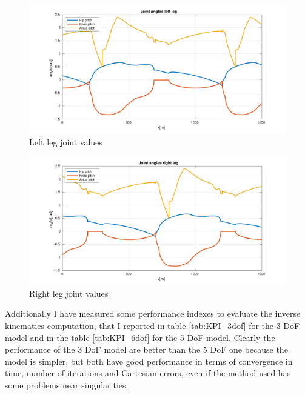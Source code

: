 \documentclass[a4paper]{article}
\begin{document}
\begin{figure}
     
        \center
        \includegraphics[scale=0.5]{plot/kinematic/left_leg_joints.pdf} 
        \caption{Left leg joint values} 
        \label{fig:left_leg_joints}
  
\end{figure}

\begin{figure}
\center
\includegraphics[scale=0.5]{plot/kinematic/right_leg_joints.pdf} 
\caption{Right leg joint values} 
\label{fig:right_leg_joints}
\end{figure}

Additionally I have measured some performance indexes to evaluate the inverse kinematics computation, that I reported in table \ref{tab:KPI_3dof} for the 3 DoF model and in the table \ref{tab:KPI_6dof}  for the 5 DoF model. Clearly the performance of the 3 DoF model are better than the 5 DoF one because the model is simpler, but both have good performance in terms of  convergence in time, number of iterations and Cartesian errors, even if the method used has some problems near singularities.



\end{document}

